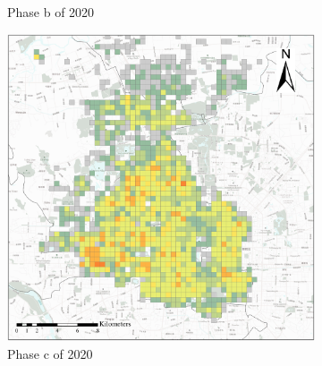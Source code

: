 \documentclass[preprints,ijgi,submit,moreauthors]{Definitions/mdpi}
\begin{document}
\begin{figure}[ht]
\begin{subfigure}{.28\textwidth}
        \caption{Phase b of 2020}\label{fig:p_b_2020}
    \end{subfigure}
    \begin{subfigure}{.28\textwidth}
        \includegraphics[width=\textwidth]{Figures/BSSPhase3_2020.eps}
        \caption{Phase c of 2020}\label{fig:p_c_2020}
    \end{subfigure}
    \begin{subfigure}{.14\textwidth}

\end{subfigure}
\end{figure}
\end{document}
